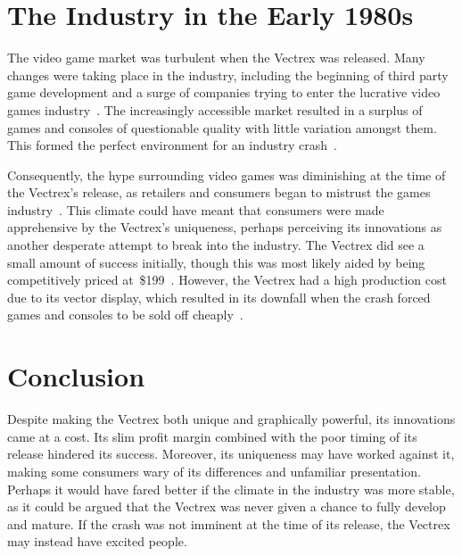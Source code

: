 \documentclass{scrartcl}
\begin{document}
\section*{The Industry in the Early 1980s}
The video game market was turbulent when the Vectrex was released. Many changes were taking place in the industry, including the beginning of third party game development and a surge of companies trying to enter the lucrative video games industry~\cite[p. 58]{wolf:pong}. The increasingly accessible market resulted in a surplus of games and consoles of questionable quality with little variation amongst them. This formed the perfect environment for an industry crash~\cite{ernkvist:crash}. 

Consequently, the hype surrounding video games was diminishing at the time of the Vectrex's release, as retailers and consumers began to mistrust the games industry~\cite[p. 109]{wolf:pong}. This climate could have meant that consumers were made apprehensive by the Vectrex's uniqueness, perhaps perceiving its innovations as another desperate attempt to break into the industry. 
The Vectrex did see a small amount of success initially, though this was most likely aided by being competitively priced at~\$199~\cite[p. 233]{kent:ultimate}. However, the Vectrex had a high production cost due to its vector display, which resulted in its downfall when the crash forced games and consoles to be sold off cheaply~\cite[p. 289]{baer:supercade}.


\section*{Conclusion}
Despite making the Vectrex both unique and graphically powerful, its innovations came at a cost. Its slim profit margin combined with the poor timing of its release hindered its success. Moreover, its uniqueness may have worked against it, making some consumers wary of its differences and unfamiliar presentation. Perhaps it would have fared better if the climate in the industry was more stable, as it could be argued that the Vectrex was never given a chance to fully develop and mature. If the crash was not imminent at the time of its release, the Vectrex may instead have excited people.




\end{document}
